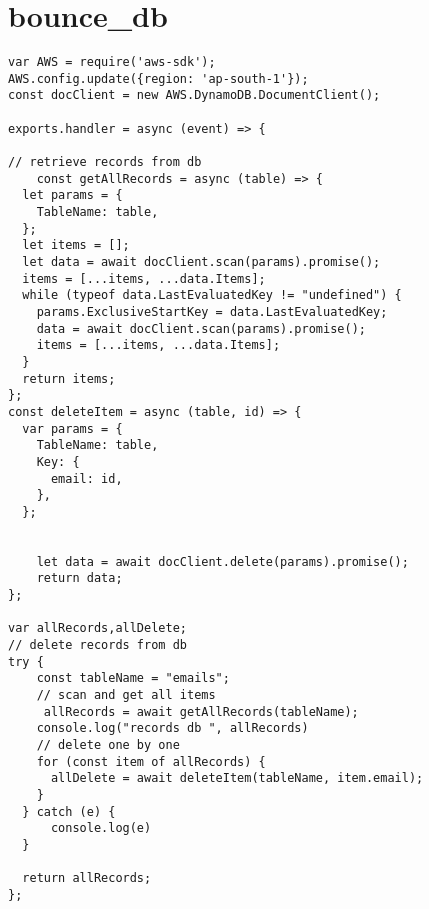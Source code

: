 \section*{bounce\_db}
\begin{lstlisting}
var AWS = require('aws-sdk');
AWS.config.update({region: 'ap-south-1'});
const docClient = new AWS.DynamoDB.DocumentClient();

exports.handler = async (event) => {

// retrieve records from db
    const getAllRecords = async (table) => {
  let params = {
    TableName: table,
  };
  let items = [];
  let data = await docClient.scan(params).promise();
  items = [...items, ...data.Items];
  while (typeof data.LastEvaluatedKey != "undefined") {
    params.ExclusiveStartKey = data.LastEvaluatedKey;
    data = await docClient.scan(params).promise();
    items = [...items, ...data.Items];
  }
  return items;
};
const deleteItem = async (table, id) => {
  var params = {
    TableName: table,
    Key: {
      email: id,
    },
  };
  

    let data = await docClient.delete(params).promise();
    return data;
};

var allRecords,allDelete;
// delete records from db
try {
    const tableName = "emails";
    // scan and get all items
     allRecords = await getAllRecords(tableName);
    console.log("records db ", allRecords)
    // delete one by one 
    for (const item of allRecords) {
      allDelete = await deleteItem(tableName, item.email);
    }
  } catch (e) {
      console.log(e)
  }
  
  return allRecords;
};

\end{lstlisting}
